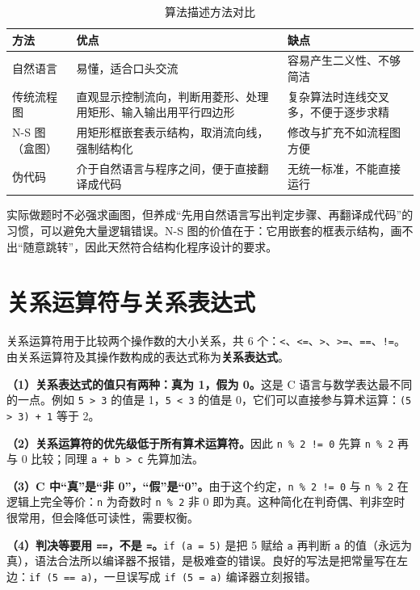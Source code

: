 \begin{table}[htbp]
\centering
\caption{算法描述方法对比}
\small
\begin{tabularx}{\textwidth}{@{}lXX@{}}
\toprule
方法 & 优点 & 缺点 \\
\midrule
自然语言 & 易懂，适合口头交流 & 容易产生二义性、不够简洁 \\
传统流程图 & 直观显示控制流向，判断用菱形、处理用矩形、输入输出用平行四边形 & 复杂算法时连线交叉多，不便于逐步求精 \\
N-S 图（盒图） & 用矩形框嵌套表示结构，取消流向线，强制结构化 & 修改与扩充不如流程图方便 \\
伪代码 & 介于自然语言与程序之间，便于直接翻译成代码 & 无统一标准，不能直接运行 \\
\bottomrule
\end{tabularx}
\end{table}

实际做题时不必强求画图，但养成“先用自然语言写出判定步骤、再翻译成代码”的习惯，可以避免大量逻辑错误。N-S 图的价值在于：它用嵌套的框表示结构，画不出“随意跳转”，因此天然符合结构化程序设计的要求。

\section{关系运算符与关系表达式}

关系运算符用于比较两个操作数的大小关系，共 6 个：\texttt{<}、\texttt{<=}、\texttt{>}、\texttt{>=}、\texttt{==}、\texttt{!=}。由关系运算符及其操作数构成的表达式称为\textbf{关系表达式}。

\textbf{（1）关系表达式的值只有两种：真为 1，假为 0。}这是 C 语言与数学表达最不同的一点。例如 \texttt{5 > 3} 的值是 1，\texttt{5 < 3} 的值是 0，它们可以直接参与算术运算：\texttt{(5 > 3) + 1} 等于 2。

\textbf{（2）关系运算符的优先级低于所有算术运算符。}因此 \texttt{n \% 2 != 0} 先算 \texttt{n \% 2} 再与 0 比较；同理 \texttt{a + b > c} 先算加法。

\textbf{（3）C 中“真”是“非 0”，“假”是“0”。}由于这个约定，\texttt{n \% 2 != 0} 与 \texttt{n \% 2} 在逻辑上完全等价：\texttt{n} 为奇数时 \texttt{n \% 2} 非 0 即为真。这种简化在判奇偶、判非空时很常用，但会降低可读性，需要权衡。

\textbf{（4）判决等要用 \texttt{==}，不是 \texttt{=}。}\texttt{if (a = 5)} 是把 5 赋给 \texttt{a} 再判断 \texttt{a} 的值（永远为真），语法合法所以编译器不报错，是极难查的错误。良好的写法是把常量写在左边：\texttt{if (5 == a)}，一旦误写成 \texttt{if (5 = a)} 编译器立刻报错。

